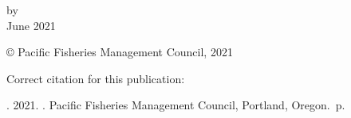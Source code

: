 \documentclass[11pt,
  english,
  a4paper,
]{article}
\date{}
\newcommand{\trTitle}{}
\newcommand{\trYear}{2021}
\newcommand{\trMonth}{June}
\newcommand{\trAuthsBack}{}
\newcommand{\trCitation}{
\begin{hangparas}{1em}{1}
\trAuthsBack{}. \trYear{}. \trTitle{}. Pacific Fisheries Management Council, Portland, Oregon. \pageref{LastPage}{}\,p.
\end{hangparas}}
\begin{document}

\renewcommand*{\thefootnote}{\fnsymbol{footnote}}

\small
\thispagestyle{empty}
\noindent
\begin{center}
\title{}
\vspace{1.5cm}
{\Large\textbf\newline{}}
\vfill
by\\
\vfill
\vfill
\trMonth{} \trYear{}
\end{center}
\clearpage

\thispagestyle{empty}
\vspace*{\fill}
\begin{center}
\copyright{} Pacific Fisheries Management Council, \trYear{}\\
\end{center}
\par
\bigskip
\noindent
Correct citation for this publication:
\bigskip
\par
\trCitation{}
\clearpage


\tableofcontents\clearpage
\label{TRlastRoman}
\clearpage

\newpage
\thispagestyle{empty} %

\pagestyle{plain}  %
\renewcommand*{\thefootnote}{\arabic{footnote}}  %
\setcounter{footnote}{0}  %
\renewcommand{\headrulewidth}{0.5pt}
\renewcommand{\footrulewidth}{0.5pt}

\newcommand{\lt}{\ensuremath <}
\newcommand{\gt}{\ensuremath >}

\newlength{\cslhangindent}
\setlength{\cslhangindent}{1.5em}
\newenvironment{cslreferences}%
  {\setlength{\parindent}{0pt}%
  \everypar{\setlength{\hangindent}{\cslhangindent}}\ignorespaces}%
  {\par}

\end{document}
